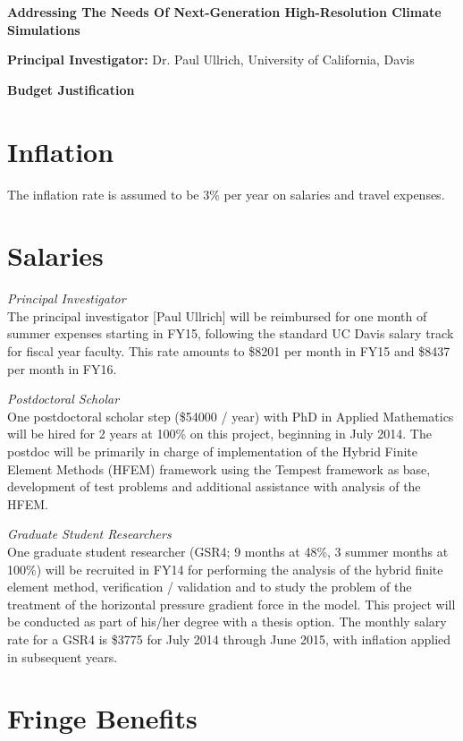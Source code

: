 \documentclass[11pt]{article}
\begin{document}
{\large \textbf{Addressing The Needs Of Next-Generation High-Resolution Climate Simulations}}

\textbf{Principal Investigator:} Dr. Paul Ullrich, University of California, Davis

{\Large \textbf{Budget Justification}}

\section{Inflation}
\vspace{-0.3cm}

The inflation rate is assumed to be 3\% per year on salaries and travel expenses.

\section{Salaries}
\vspace{-0.3cm}

\textit{Principal Investigator} \\
The principal investigator [Paul Ullrich] will be reimbursed for one month of summer expenses starting in FY15, following the standard UC Davis salary track for fiscal year faculty.  This rate amounts to \$8201 per month in FY15 and \$8437 per month in FY16.

\textit{Postdoctoral Scholar} \\
One postdoctoral scholar step (\$54000 / year) with PhD in Applied Mathematics will be hired for 2 years at 100\% on this project, beginning in July 2014.  The postdoc will be primarily in charge of implementation of the Hybrid Finite Element Methods (HFEM) framework using the Tempest framework as base, development of test problems and additional assistance with analysis of the HFEM.

\textit{Graduate Student Researchers} \\
One graduate student researcher (GSR4; 9 months at 48\%, 3 summer months at 100\%) will be recruited in FY14 for performing the analysis of the hybrid finite element method, verification / validation and to study the problem of the treatment of the horizontal pressure gradient force in the model.  This project will be conducted as part of his/her degree with a thesis option.  The monthly salary rate for a GSR4 is \$3775 for July 2014 through June 2015, with inflation applied in subsequent years.

\section{Fringe Benefits}
\vspace{-0.3cm}
\end{document}
